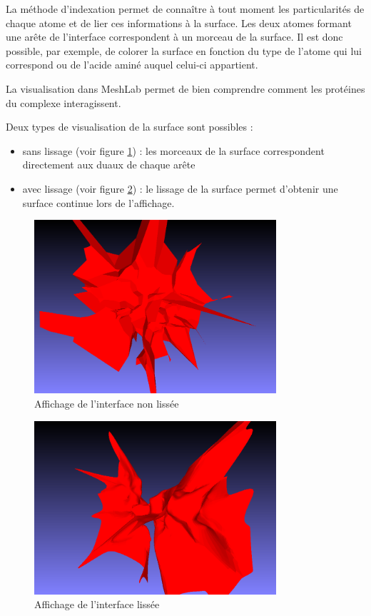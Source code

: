 La méthode d'indexation permet de connaître à tout moment les particularités de chaque
atome et de lier ces informations à la surface. Les deux atomes formant une arête
de l'interface correspondent à un morceau de la surface. Il est donc possible, par exemple,
de colorer la surface en fonction du type de l'atome qui lui correspond ou de l'acide aminé
auquel celui-ci appartient.

La visualisation dans MeshLab permet de bien comprendre comment les protéines du complexe interagissent.

Deux types de visualisation de la surface sont possibles :
\begin{itemize}
  \item sans lissage (voir figure \ref{fig::surf_no_smooth}) : les morceaux de la surface correspondent
  directement aux duaux de chaque arête
  \item avec lissage (voir figure \ref{fig::surf_smooth}) : le lissage de la surface
  permet d'obtenir une surface continue lors de l'affichage.
\end{itemize}

\begin{figure}[ht]
\centering
  \includegraphics[width=0.8\textwidth]{figures/surf_no_smooth.png}
  \caption{Affichage de l'interface non lissée}
  \label{fig::surf_no_smooth}
\end{figure}

\begin{figure}[ht]
\centering
  \includegraphics[width=0.8\textwidth]{figures/surf_smooth.png}
  \caption{Affichage de l'interface lissée}
  \label{fig::surf_smooth}
\end{figure}

